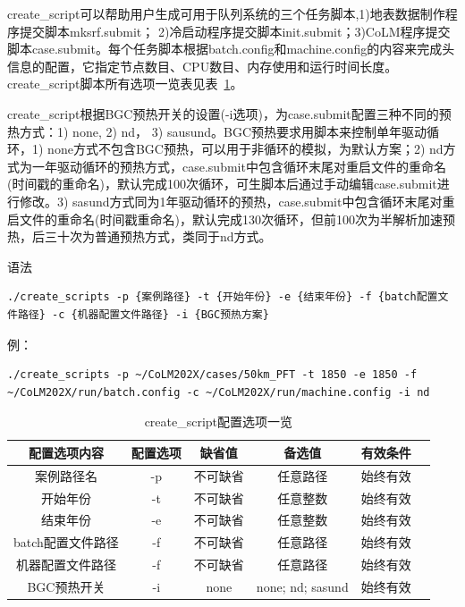 create\_script可以帮助用户生成可用于队列系统的三个任务脚本,1)地表数据制作程序提交脚本mksrf.submit； 2)冷启动程序提交脚本init.submit；3)CoLM程序提交脚本case.submit。每个任务脚本根据batch.config和machine.config的内容来完成头信息的配置，它指定节点数目、CPU数目、内存使用和运行时间长度。create\_script脚本所有选项一览表见表~\ref{tab:createscript_option}。

create\_script根据BGC预热开关的设置(-i选项)，为case.submit配置三种不同的预热方式：1) none, 2) nd， 3) sausund。BGC预热要求用脚本来控制单年驱动循环，1) none方式不包含BGC预热，可以用于非循环的模拟，为默认方案；2) nd方式为一年驱动循环的预热方式，case.submit中包含循环末尾对重启文件的重命名(时间戳的重命名)，默认完成100次循环，可生脚本后通过手动编辑case.submit进行修改。3) sasund方式同为1年驱动循环的预热，case.submit中包含循环末尾对重启文件的重命名(时间戳重命名)，默认完成130次循环，但前100次为半解析加速预热，后三十次为普通预热方式，类同于nd方式。

语法
\begin{lstlisting}[xleftmargin=2.5em]
./create_scripts -p {案例路径} -t {开始年份} -e {结束年份} -f {batch配置文件路径} -c {机器配置文件路径} -i {BGC预热方案}
\end{lstlisting}

例：
\begin{lstlisting}[xleftmargin=2.5em]
./create_scripts -p ~/CoLM202X/cases/50km_PFT -t 1850 -e 1850 -f ~/CoLM202X/run/batch.config -c ~/CoLM202X/run/machine.config -i nd
\end{lstlisting}

\begin{table}[!htbp]
\renewcommand{\arraystretch}{1.5}
\centering
\caption{create\_script配置选项一览}\label{tab:createscript_option}
\begin{tabular}{
cccccc} \toprule
\textbf{配置选项内容} & \textbf{配置选项} & \textbf{缺省值} & \textbf{备选值} & \textbf{有效条件}\\ \midrule
案例路径名 & -p & 不可缺省 & 任意路径 & 始终有效 \\
开始年份 & -t & 不可缺省 & 任意整数 & 始终有效\\
结束年份 & -e & 不可缺省 & 任意整数 & 始终有效\\
batch配置文件路径 & -f & 不可缺省 & 任意路径 & 始终有效 \\
机器配置文件路径 & -f & 不可缺省 & 任意路径 & 始终有效 \\
BGC预热开关 & -i &none & none; nd; sasund& 始终有效 \\
\bottomrule
\end{tabular}
\end{table}

